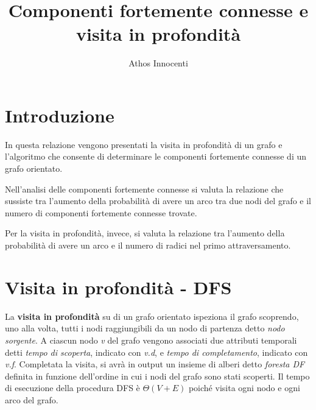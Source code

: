 \documentclass[11pt]{article}
\begin{document}
\title{\Large Componenti fortemente connesse e visita in profondità}\date{}
\author{Athos Innocenti}
\maketitle
\section{Introduzione}
In questa relazione vengono presentati la visita in profondità di un grafo e l'algoritmo che consente di determinare le componenti fortemente connesse di un grafo orientato.

Nell'analisi delle componenti fortemente connesse si valuta la relazione che sussiste tra l'aumento della probabilità di avere un arco tra due nodi del grafo e il numero di componenti fortemente connesse trovate.

Per la visita in profondità, invece, si valuta la relazione tra l'aumento della probabilità di avere un arco e il numero di radici nel primo attraversamento.
\section{Visita in profondità - DFS}
La \textbf{visita in profondità} su di un grafo orientato ispeziona il grafo scoprendo, uno alla volta, tutti i nodi raggiungibili da un nodo di partenza detto \textit{nodo sorgente}. A ciascun nodo \textit{v} del grafo vengono associati due attributi temporali detti \textit{tempo di scoperta}, indicato con \textit{v.d}, e \textit{tempo di completamento}, indicato con \textit{v.f}. Completata la visita, si avrà in output un insieme di alberi detto \textit{foresta DF} definita in funzione dell'ordine in cui i nodi del grafo sono stati scoperti. Il tempo di esecuzione della procedura DFS è $\Theta(V + E)$ poiché visita ogni nodo e ogni arco del grafo.
\end{document}
